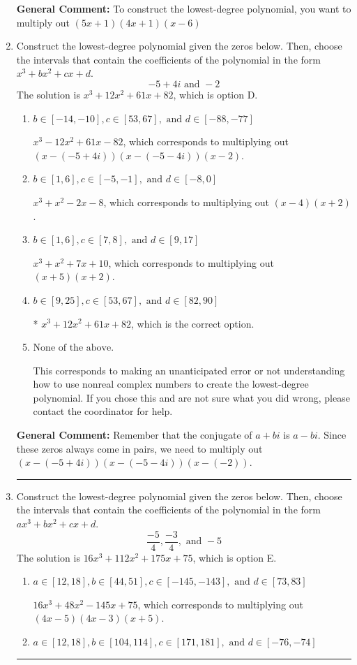 \documentclass{extbook}[14pt]
\newcommand{\litem}[1]{\item #1

\rule{\textwidth}{0.4pt}}
\begin{document}
\begin{enumerate}
{\textbf{General Comment:} To construct the lowest-degree polynomial, you want to multiply out $(5x + 1)(4x + 1)(x -6)$
}
\litem{
Construct the lowest-degree polynomial given the zeros below. Then, choose the intervals that contain the coefficients of the polynomial in the form $x^3+bx^2+cx+d$.
\[ -5 + 4 i \text{ and } -2 \]The solution is \( x^{3} +12 x^{2} +61 x + 82 \), which is option D.\begin{enumerate}[label=\Alph*.]
\item \( b \in [-14, -10], c \in [53, 67], \text{ and } d \in [-88, -77] \)

$x^{3} -12 x^{2} +61 x -82$, which corresponds to multiplying out $(x-(-5 + 4 i))(x-(-5 - 4 i))(x -2)$.
\item \( b \in [1, 6], c \in [-5, -1], \text{ and } d \in [-8, 0] \)

$x^{3} + x^{2} -2 x -8$, which corresponds to multiplying out $(x -4)(x + 2)$.
\item \( b \in [1, 6], c \in [7, 8], \text{ and } d \in [9, 17] \)

$x^{3} + x^{2} +7 x + 10$, which corresponds to multiplying out $(x + 5)(x + 2)$.
\item \( b \in [9, 25], c \in [53, 67], \text{ and } d \in [82, 90] \)

* $x^{3} +12 x^{2} +61 x + 82$, which is the correct option.
\item \( \text{None of the above.} \)

This corresponds to making an unanticipated error or not understanding how to use nonreal complex numbers to create the lowest-degree polynomial. If you chose this and are not sure what you did wrong, please contact the coordinator for help.
\end{enumerate}

\textbf{General Comment:} Remember that the conjugate of $a+bi$ is $a-bi$. Since these zeros always come in pairs, we need to multiply out $(x-(-5 + 4 i))(x-(-5 - 4 i))(x-(-2))$.
}
\litem{
Construct the lowest-degree polynomial given the zeros below. Then, choose the intervals that contain the coefficients of the polynomial in the form $ax^3+bx^2+cx+d$.
\[ \frac{-5}{4}, \frac{-3}{4}, \text{ and } -5 \]The solution is \( 16x^{3} +112 x^{2} +175 x + 75 \), which is option E.\begin{enumerate}[label=\Alph*.]
\item \( a \in [12, 18], b \in [44, 51], c \in [-145, -143], \text{ and } d \in [73, 83] \)

$16x^{3} +48 x^{2} -145 x + 75$, which corresponds to multiplying out $(4x -5)(4x -3)(x + 5)$.
\item \( a \in [12, 18], b \in [104, 114], c \in [171, 181], \text{ and } d \in [-76, -74] \)


\end{enumerate}}
\end{enumerate}
\end{document}
